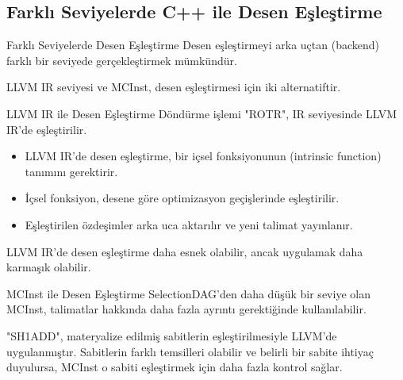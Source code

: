 \ifAdvanced
    
\fi

\subsection{Farklı Seviyelerde C++ ile Desen Eşleştirme}


\begin{frame}{Farklı Seviyelerde Desen Eşleştirme}
Desen eşleştirmeyi arka uçtan (backend) farklı bir seviyede gerçekleştirmek mümkündür.

LLVM IR seviyesi ve MCInst, desen eşleştirmesi için iki alternatiftir.
\begin{center}
\end{center}
\end{frame}

\begin{frame}{LLVM IR ile Desen Eşleştirme}
Döndürme işlemi "ROTR", IR seviyesinde LLVM IR'de eşleştirilir.
    \begin{itemize}
        \item LLVM IR'de desen eşleştirme, bir içsel fonksiyonunun (intrinsic function) tanımını gerektirir.
        \item İçsel fonksiyon, desene göre optimizasyon geçişlerinde eşleştirilir.
        \item Eşleştirilen özdeşimler arka uca aktarılır ve yeni talimat yayınlanır.
    \end{itemize}
    LLVM IR'de desen eşleştirme daha esnek olabilir, ancak uygulamak daha karmaşık olabilir.
\end{frame}

\begin{frame}{MCInst ile Desen Eşleştirme}
SelectionDAG'den daha düşük bir seviye olan MCInst, talimatlar hakkında daha fazla ayrıntı gerektiğinde kullanılabilir.

"SH1ADD", materyalize edilmiş sabitlerin eşleştirilmesiyle LLVM'de uygulanmıştır. Sabitlerin farklı temsilleri olabilir ve belirli bir sabite ihtiyaç duyulursa, MCInst o sabiti eşleştirmek için daha fazla kontrol sağlar.
\end{frame}
